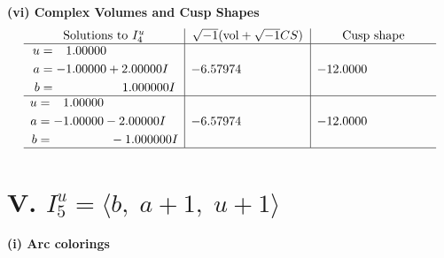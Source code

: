 \documentclass[1p]{elsarticle_modified}
\theoremstyle{definition}
\newcommand{\I}{\sqrt{-1}}
\begin{document}
\newpage\flushleft \textbf{(vi) Complex Volumes and Cusp Shapes}
$$\begin{array}{c|c|c}  
\text{Solutions to }I^u_{4}& \I (\text{vol} + \sqrt{-1}CS) & \text{Cusp shape}\\
 \hline 
\begin{aligned}
u &= \phantom{-}1.00000\phantom{ +0.000000I} \\
a &= -1.00000 + 2.00000 I \\
b &= \phantom{-0.000000 -}1.000000 I\end{aligned}
 & -6.57974\phantom{ +0.000000I} & -12.0000\phantom{ +0.000000I} \\ \hline\begin{aligned}
u &= \phantom{-}1.00000\phantom{ +0.000000I} \\
a &= -1.00000 - 2.00000 I \\
b &= \phantom{-0.000000 } -1.000000 I\end{aligned}
 & -6.57974\phantom{ +0.000000I} & -12.0000\phantom{ +0.000000I}\\
 \hline 
 \end{array}$$\newpage\newpage\renewcommand{\arraystretch}{1}
\centering \section*{V. $I^u_{5}= \langle b,\;a+1,\;u+1 \rangle$}
\flushleft \textbf{(i) Arc colorings}\\
\end{document}
